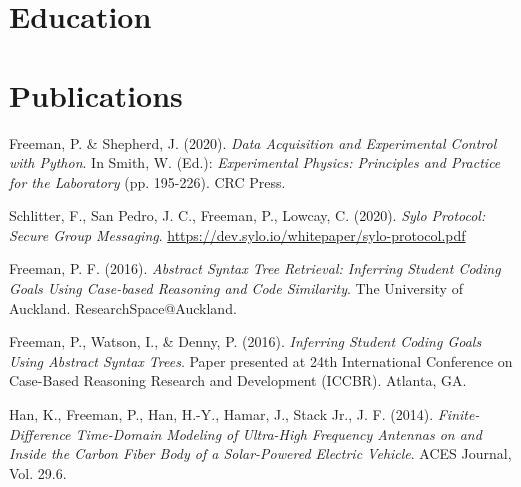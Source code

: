 \documentclass[a4paper]{twentysecondcv}
\begin{document}
\section{Education}
\begin{twenty}
\end{twenty}

\section{Publications}

Freeman, P. \& Shepherd, J. (2020). \emph{Data Acquisition and Experimental
Control with Python}. In Smith, W. (Ed.): \emph{Experimental Physics: Principles and Practice for the
Laboratory} (pp. 195-226). CRC Press.

Schlitter, F., San Pedro, J. C., Freeman, P., Lowcay, C. (2020). \emph{Sylo
Protocol: Secure Group Messaging}. \href{https://dev.sylo.io/whitepaper/sylo-protocol.pdf}{https://dev.sylo.io/whitepaper/sylo-protocol.pdf}

Freeman, P. F. (2016). \emph{Abstract Syntax Tree Retrieval: Inferring Student
Coding Goals Using Case-based Reasoning and Code Similarity}. The University of
Auckland. ResearchSpace@Auckland.

Freeman, P., Watson, I., \& Denny, P. (2016). \emph{Inferring Student Coding
Goals Using Abstract Syntax Trees}. Paper presented at 24th International
Conference on Case-Based Reasoning Research and Development (ICCBR). Atlanta, GA.\@

Han, K., Freeman, P., Han, H.-Y., Hamar, J., Stack Jr., J. F. (2014).
\emph{Finite-Difference Time-Domain Modeling of Ultra-High Frequency Antennas
on and Inside the Carbon Fiber Body of a Solar-Powered Electric Vehicle}. ACES
Journal, Vol. 29.6.
\end{document}
